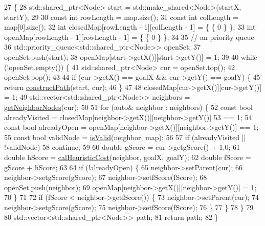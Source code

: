 \begin{DoxyCode}
27                                           \{
28   std::shared\_ptr<Node> start = std::make\_shared<Node>(startX, startY);
29 
30   \textcolor{keyword}{const} \textcolor{keywordtype}{int} rowLength = map.size();
31   \textcolor{keyword}{const} \textcolor{keywordtype}{int} colLength = map[0].size();
32   \textcolor{keywordtype}{int} closedMap[rowLength - 1][colLength - 1] = \{ \{ 0 \} \};
33   \textcolor{keywordtype}{int} openMap[rowLength - 1][rowLength - 1] = \{ \{ 0 \} \};
34 
35   \textcolor{comment}{//  an priority queue}
36   std::priority\_queue<std::shared\_ptr<Node>> openSet;
37   openSet.push(start);
38   openMap[start->getX()][start->getY()] = 1;
39 
40   \textcolor{keywordflow}{while} (!openSet.empty()) \{
41     std::shared\_ptr<Node> cur = openSet.top();
42     openSet.pop();
43 
44     \textcolor{keywordflow}{if} (cur->getX() == goalX && cur->getY() == goalY) \{
45       \textcolor{keywordflow}{return} \hyperlink{classAStarPathFinder_adc4361b6085d2436a03388c7e0489d22}{constructPath}(start, cur);
46     \}
47 
48     closedMap[cur->getX()][cur->getY()] = 1;
49     std::vector<std::shared\_ptr<Node>> neighbors = \hyperlink{classAStarPathFinder_a153563a6eb940562512a4e2aca0e958d}{getNeighborNodes}(cur);
50 
51     \textcolor{keywordflow}{for} (\textcolor{keyword}{auto}& neighbor : neighbors) \{
52       \textcolor{keyword}{const} \textcolor{keywordtype}{bool} alreadyVisited = closedMap[neighbor->getX()][neighbor->getY()]
53           == 1;
54       \textcolor{keyword}{const} \textcolor{keywordtype}{bool} alreadyOpen = openMap[neighbor->getX()][neighbor->getY()] == 1;
55       \textcolor{keyword}{const} \textcolor{keywordtype}{bool} validNode = \hyperlink{classAStarPathFinder_a43bdab730bb812a70c0da813f1302859}{isValid}(neighbor, map);
56 
57       \textcolor{keywordflow}{if} (alreadyVisited || !validNode)
58         \textcolor{keywordflow}{continue};
59 
60       \textcolor{keywordtype}{double} gScore = cur->getgScore() + 1.0;
61       \textcolor{keywordtype}{double} hScore = \hyperlink{classAStarPathFinder_a5510513176fae8044e6f4be5ed7faa43}{calHeuristicCost}(neighbor, goalX, goalY);
62       \textcolor{keywordtype}{double} fScore = gScore + hScore;
63 
64       \textcolor{keywordflow}{if} (!alreadyOpen) \{
65         neighbor->setParent(cur);
66         neighbor->setgScore(gScore);
67         neighbor->setfScore(fScore);
68         openSet.push(neighbor);
69         openMap[neighbor->getX()][neighbor->getY()] = 1;
70       \}
71 
72       \textcolor{keywordflow}{if} (fScore < neighbor->getfScore()) \{
73         neighbor->setParent(cur);
74         neighbor->setgScore(gScore);
75         neighbor->setfScore(fScore);
76       \}
77     \}
78   \}
79 
80   std::vector<std::shared\_ptr<Node>> path;
81   \textcolor{keywordflow}{return} path;
82 \}
\end{DoxyCode}
